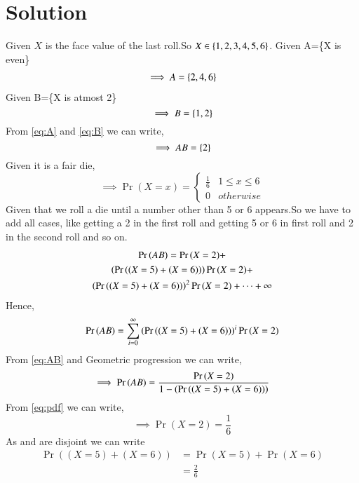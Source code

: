 \documentclass[journal,12pt,twocolumn]{IEEEtran}
\begin{document}
\section{Solution}
Given $X$ is the face value of the last roll.So $X \in \left\{1,2,3,4,5,6\right\}$.
Given A=\{X is even\}
\begin{align}
    \implies A=\left\{2,4,6\right\} \label{eq:A}
\end{align}
Given B=\{X is atmost 2\}
\begin{equation}
    \implies B=\left\{1,2\right\} \label{eq:B}
\end{equation}
From \eqref{eq:A} and \eqref{eq:B} we can write,
\begin{equation}
    \implies AB=\left\{2\right\} 
\end{equation}
Given it is a fair die,
\begin{equation}
    \implies \Pr(X=x)=
    \begin{cases}
    \frac{1}{6} & 1 \leq x \leq 6\\
    0 & otherwise
    \end{cases}
    \label{eq:pdf}
\end{equation}
Given that we roll a die until a number other than 5 or 6 appears.So we have to add all cases, like getting a 2 in the first roll and getting 5 or 6 in first roll and 2 in the second roll and so on.
\begin{multline}
    \Pr{(AB)}=\Pr{(X=2)}+\\\left(\Pr{((X=5)+(X=6))}\right)\Pr{(X=2)}+\\\left(\Pr{((X=5)+(X=6))}\right)^{2}\Pr{(X=2)}+\cdots+\infty \label{eq:AB}
\end{multline}
Hence,
\begin{equation}
    \Pr{(AB)}=\sum_{i=0}^{\infty} \left(\Pr{((X=5)+(X=6))}\right)^{i}\Pr{(X=2)}
\end{equation}
From \eqref{eq:AB} and Geometric progression we can write,
\begin{equation}
    \implies \Pr{(AB)}=\frac{\Pr{(X=2)}}{1-\left(\Pr{((X=5)+(X=6))}\right)}
\end{equation}
From \eqref{eq:pdf} we can write,
\begin{equation}
    \implies \Pr{(X=2)}=\frac{1}{6} \label{eq:2}
\end{equation}
As  and  are disjoint we can write
\begin{align}
    \Pr{((X=5)+(X=6))}&=\Pr{(X=5)}+\Pr{(X=6)}\\
    &=\frac{2}{6}\label{eq:5,6}
\end{align}
\end{document}
